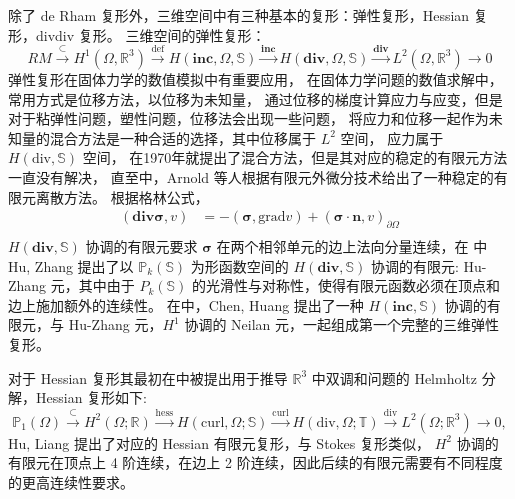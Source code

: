 \documentclass[lang=cn,a4paper,newtx]{elegantpaper}
\begin{document}
除了 de Rham 复形外，三维空间中有三种基本的复形：弹性复形，Hessian 复形，divdiv
复形。
三维空间的弹性复形： 
$$
RM \xrightarrow{\subset} H^1(\Omega, \mathbb{R}^3) 
\xrightarrow{\mathrm{def}} H(\mathbf{inc}, \Omega, \mathbb{S})
\xrightarrow{\mathbf{inc}} H(\mathbf{div}, \Omega, \mathbb{S})
\xrightarrow{\mathbf{div}} L^2(\Omega, \mathbb{R}^3) \rightarrow 0
$$ 
弹性复形在固体力学的数值模拟中有重要应用，
在固体力学问题的数值求解中，常用方式是位移方法，以位移为未知量，
通过位移的梯度计算应力与应变，但是对于粘弹性问题，塑性问题，位移法会出现一些问题，
将应力和位移一起作为未知量的混合方法是一种合适的选择，其中位移属于 $L^2$ 空间，
应力属于 $H(\text{div}, \mathbb{S})$ 空间，
在1970年就提出了混合方法\cite{fraeijs1965displacement}，但是其对应的稳定的有限元方法一直没有解决，
直至\cite{arnold2002mixed}中，Arnold 等人根据有限元外微分技术给出了一种稳定的有限元离散方法。
根据格林公式，
$$
\begin{aligned}
  (\mathbf{div} \boldsymbol{\sigma}, v) & = -(\boldsymbol{\sigma}, \mathrm{grad} v) +
  (\boldsymbol{\sigma}\cdot \boldsymbol{n}, v)_{\partial \Omega}\\
\end{aligned}
$$ $H(\mathbf{div}, \mathbb{S})$ 协调的有限元要求
$\boldsymbol{\sigma}$ 在两个相邻单元的边上法向分量连续，在\cite{hu2015family,
hu2015finite}
中 Hu, Zhang 提出了以 $\mathbb{P}_k(\mathbb{S})$ 为形函数空间的
$H(\mathbf{div}, \mathbb{S})$ 协调的有限元: Hu-Zhang 元，其中由于
$P_k(\mathbb{S})$
的光滑性与对称性，使得有限元函数必须在顶点和边上施加额外的连续性。
在\cite{chenhuang2022finitemc}中，Chen, Huang
提出了一种 $H(\mathbf{inc}, \mathbb{S})$ 协调的有限元，与 Hu-Zhang
元，$H^1$ 协调的 Neilan 元，一起组成第一个完整的三维弹性复形。

对于 Hessian 复形其最初在\cite{pauly2020divdiv}中被提出用于推导 
$\mathbb{R}^3$ 中双调和问题的 Helmholtz 分解，Hessian 复形如下:
$$
\mathbb{P}_1(\Omega)\stackrel{\subset}{\longrightarrow}
H^2(\Omega;\mathbb{R})\stackrel{\mathrm{hess}}{\longrightarrow}H(\mathrm{curl},\Omega;\mathbb{S})\stackrel{\mathrm{curl}}{\longrightarrow}H(\mathrm{div},\Omega;\mathbb{T})\stackrel{\mathrm{div}}{\longrightarrow}L^2(\Omega;\mathbb{R}^3)\longrightarrow0,
$$
Hu, Liang \cite{huliang2021conforming}
提出了对应的 Hessian 有限元复形，与 Stokes 复形类似，
$H^2$ 协调的有限元在顶点上 4 阶连续，在边上 2
阶连续，因此后续的有限元需要有不同程度的更高连续性要求。
\end{document}
